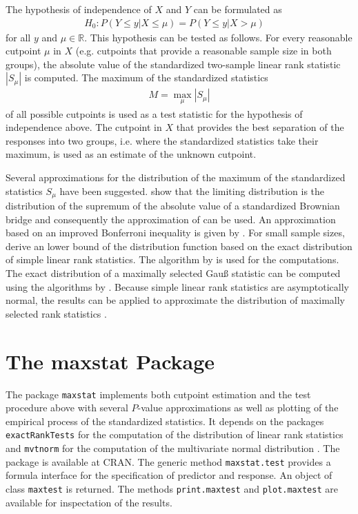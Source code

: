 \documentclass{article}
\newcommand{\Rz}{\mathbb{R} }
\begin{document}
The hypothesis of independence of $X$ and $Y$ can be formulated as
\begin{eqnarray*}
H_0: P(Y \le y | X \le \mu) = P(Y \le y | X > \mu) \quad
\end{eqnarray*}
for all $ y $ and $ \mu \in \Rz $.
This hypothesis can be tested as follows. For every reasonable cutpoint $\mu$
in $X$
(e.g. cutpoints that provide a reasonable sample size in both groups),  the
absolute value of the standardized two-sample linear rank statistic $|S_\mu|$ 
is
computed. The maximum of the standardized statistics 
\begin{eqnarray*}
M = \max_\mu |S_\mu|
\end{eqnarray*}
of all possible
cutpoints is used as a test statistic for the hypothesis of independence
above. The cutpoint in $X$ that provides the best separation of the
responses into two groups, 
i.e. where the standardized statistics take their maximum, 
is used as an estimate of the unknown cutpoint.

Several approximations for the distribution of the maximum of the
standardized statistics $S_\mu$ have been suggested. \cite{maximally-:1992}
show that the limiting distribution is the distribution of the supremum of
the absolute value of a standardized Brownian bridge and consequently the
approximation of \cite{maximally-:1982} can be used. An approximation based
on an improved Bonferroni inequality is given by \cite{classifica:1994}. For
small sample sizes, \cite{on-the-exa:2001} derive an lower bound of the
distribution function based on the
exact distribution of simple linear rank statistics. The algorithm by
\cite{axact-dist:1986} is used for the computations.
The exact distribution
of a maximally selected Gau{\ss} statistic can be computed using the
algorithms by \cite{numerical-:1992}. Because simple linear rank statistics
are asymptotically normal, the results can be applied to approximate the
distribution of maximally
selected rank statistics \citep[see][]{on-the-exa:2001}. 

\section{The maxstat Package}

The package \texttt{maxstat} implements both cutpoint estimation and the test
procedure above with several $P$-value approximations as well as plotting
of the empirical process of the standardized statistics. It depends on the
packages \texttt{exactRankTests} for the computation of the distribution of
linear rank statistics \citep{on-exact-r:2001} and \texttt{mvtnorm} for the
computation of the multivariate normal distribution
\citep{on-multiva:2001}. The package is available at CRAN. The generic method
\texttt{maxstat.test} provides a formula interface for the specification of
predictor and response. An object of class \texttt{maxtest} is returned.
The methods \texttt{print.maxtest} and
\texttt{plot.maxtest} are available for inspectation of the results. 
\end{document}
